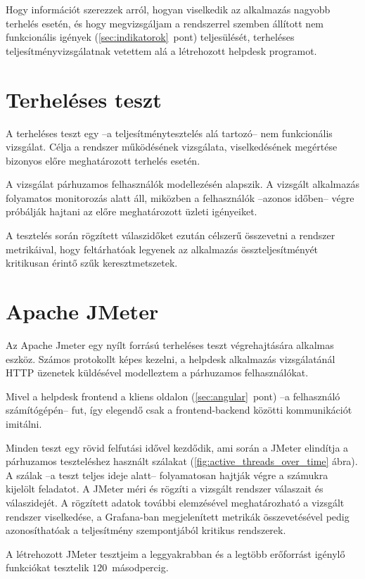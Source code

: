 Hogy információt szerezzek arról, hogyan viselkedik az alkalmazás nagyobb terhelés esetén, és hogy megvizsgáljam a rendszerrel szemben állított nem funkcionális igények  (\ref{sec:indikatorok}~pont)  teljesülését,	terheléses teljesítményvizsgálatnak vetettem alá a létrehozott helpdesk programot.


\section{Terheléses teszt}
A terheléses teszt egy --a teljesítménytesztelés alá tartozó-- nem funkcionális vizsgálat. Célja a rendszer működésének vizsgálata, viselkedésének megértése bizonyos előre meghatározott terhelés esetén.

A vizsgálat párhuzamos felhasználók modellezésén alapszik. A vizsgált alkalmazás folyamatos monitorozás alatt áll, miközben a felhasználók --azonos időben-- végre próbálják hajtani az előre meghatározott üzleti igényeiket.

A tesztelés során rögzített válaszidőket ezután célszerű összevetni a rendszer metrikáival, hogy feltárhatóak legyenek az alkalmazás összteljesítményét kritikusan érintő szűk keresztmetszetek.


\section{Apache JMeter}	
Az Apache Jmeter egy nyílt forrású terheléses teszt végrehajtására alkalmas eszköz. Számos protokollt képes kezelni, a helpdesk alkalmazás vizsgálatánál HTTP üzenetek küldésével modelleztem a párhuzamos felhasználókat.

Mivel a helpdesk frontend a kliens oldalon (\ref{sec:angular}~pont) --a felhasználó számítógépén-- fut, így elegendő csak a frontend-backend közötti kommunikációt imitálni.

Minden teszt egy rövid felfutási idővel kezdődik, ami során a JMeter elindítja a párhuzamos teszteléshez használt szálakat (\ref{fig:active_threads_over_time} ábra). A szálak --a teszt teljes ideje alatt-- folyamatosan hajtják végre a számukra kijelölt feladatot. A JMeter méri és rögzíti a vizsgált rendszer válaszait és válaszidejét. A rögzített adatok további elemzésével meghatározható a vizsgált rendszer viselkedése, a Grafana-ban megjelenített metrikák összevetésével pedig azonosíthatóak a teljesítmény szempontjából kritikus rendszerek.

A létrehozott JMeter tesztjeim a leggyakrabban és a legtöbb erőforrást igénylő funkciókat tesztelik $120$~másodpercig.


